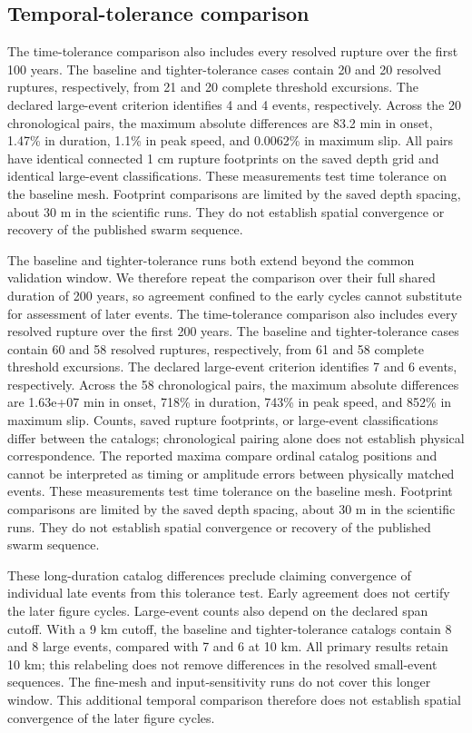 \documentclass[11pt]{article}
\begin{document}
\subsection{Temporal-tolerance comparison}
The time-tolerance comparison also includes every resolved rupture over the first 100 years. The baseline and tighter-tolerance cases contain 20 and 20 resolved ruptures, respectively, from 21 and 20 complete threshold excursions.
The declared large-event criterion identifies 4 and 4 events, respectively.
Across the 20 chronological pairs, the maximum absolute differences are 83.2 min in onset, 1.47\% in duration, 1.1\% in peak speed, and 0.0062\% in maximum slip.
All pairs have identical connected 1 cm rupture footprints on the saved depth grid and identical large-event classifications.
These measurements test time tolerance on the baseline mesh. Footprint comparisons are limited by the saved depth spacing, about 30 m in the scientific runs. They do not establish spatial convergence or recovery of the published swarm sequence.

The baseline and tighter-tolerance runs both extend beyond the common validation window. We therefore repeat the comparison over their full shared duration of 200 years, so agreement confined to the early cycles cannot substitute for assessment of later events.
The time-tolerance comparison also includes every resolved rupture over the first 200 years. The baseline and tighter-tolerance cases contain 60 and 58 resolved ruptures, respectively, from 61 and 58 complete threshold excursions.
The declared large-event criterion identifies 7 and 6 events, respectively.
Across the 58 chronological pairs, the maximum absolute differences are 1.63e+07 min in onset, 718\% in duration, 743\% in peak speed, and 852\% in maximum slip.
Counts, saved rupture footprints, or large-event classifications differ between the catalogs; chronological pairing alone does not establish physical correspondence. The reported maxima compare ordinal catalog positions and cannot be interpreted as timing or amplitude errors between physically matched events.
These measurements test time tolerance on the baseline mesh. Footprint comparisons are limited by the saved depth spacing, about 30 m in the scientific runs. They do not establish spatial convergence or recovery of the published swarm sequence.

These long-duration catalog differences preclude claiming convergence of individual late events from this tolerance test. Early agreement does not certify the later figure cycles.
Large-event counts also depend on the declared span cutoff. With a 9 km cutoff, the baseline and tighter-tolerance catalogs contain 8 and 8 large events, compared with 7 and 6 at 10 km. All primary results retain 10 km; this relabeling does not remove differences in the resolved small-event sequences.
The fine-mesh and input-sensitivity runs do not cover this longer window. This additional temporal comparison therefore does not establish spatial convergence of the later figure cycles.
\end{document}
